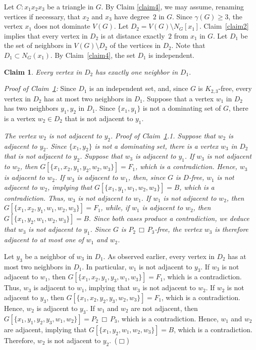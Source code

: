 \documentclass[12pt]{article}
\newtheorem{claim}{Claim}
\newcommand{\smallqed}{{\tiny ($\Box$)}}
\newcommand{\cart}{\, \Box \,}
\newenvironment{unnumbered}[1]{\trivlist \item [\hskip \labelsep {\bf
#1}]\ignorespaces\it}{\endtrivlist}
\begin{document}
\medskip

\noindent Let $C \colon x_1x_2x_3$ be a triangle in $G$. 
By Claim \ref{claim4}, we may assume, renaming vertices if necessary,  that $x_2$ and $x_3$ have degree~$2$ in $G$.
 Since $\gamma(G) \ge 3$, the vertex $x_1$ does not dominate $V(G)$. Let $D_2 = V(G) \setminus N_G[x_1]$. 
 Claim~\ref{claim2} implies that every vertex in $D_2$ is at distance exactly~$2$ from $x_1$ in $G$. 
 Let $D_1$ be the set of neighbors in $V(G) \setminus D_2$ of the vertices in $D_2$. 
 Note that $D_1 \subset N_G(x_1)$. By Claim~\ref{claim4}, the set $D_1$ is independent. 

\begin{claim}\label{claim5}
Every vertex in $D_2$ has exactly one neighbor in $D_1$.
\end{claim}
{\it Proof of Claim~\ref{claim5}:} 
Since $D_1$ is an independent set, and, since $G$ is $K_{2,3}$-free, every vertex in $D_2$ has at most two neighbors in $D_1$. 
Suppose that a vertex $w_1$ in $D_2$ has two neighbors $y_1, y_2$ in $D_1$. 
Since $\{x_1, y_1\}$ is not a dominating set of $G$, there is a vertex $w_2\in D_2$ that is not adjacent to $y_1$.

\begin{unnumbered}{Claim~\ref{claim5}.1}
The vertex $w_2$ is not adjacent to $y_2$.
\end{unnumbered}
{\it Proof of Claim~\ref{claim5}.1.} Suppose that $w_2$ is adjacent to $y_2$.
Since $\{x_1, y_2\}$ is not a dominating set, 
there is a vertex $w_3$ in $D_2$ that is not adjacent to $y_2$. Suppose that $w_3$ is adjacent to $y_1$. If $w_3$ is not adjacent to $w_2$, then $G[\{x_1,x_2,y_1,y_2,w_2,w_3\}]=F_1$, which is a contradiction. Hence, $w_3$ is adjacent to $w_2$. If $w_3$ is adjacent to $w_1$, 
then, since $G$ is $D$-free, $w_1$ is not adjacent to $w_2$, implying that $G[\{x_1,y_1,w_1,w_2,w_3\}]=B$, which is a contradiction. Thus, $w_3$ is not adjacent to $w_1$. If $w_1$ is not adjacent to $w_2$, then  $G[\{x_1,x_2,y_1,w_1,w_2,w_3\}]=F_1$, while, if $w_1$ is adjacent to $w_2$, then  $G[\{x_1,y_2,w_1,w_2,w_3\}]=B$. Since both cases produce a contradiction, we deduce that $w_3$ is not adjacent to $y_1$. Since $G$ is $P_2 \cart P_3$-free, the vertex $w_3$ is therefore adjacent to at most one of $w_1$ and $w_2$.

Let $y_3$ be a neighbor of $w_3$ in $D_1$. As observed earlier, every vertex in $D_2$ has at most two neighbors in $D_1$. In particular, $w_1$ is not adjacent to $y_3$. If $w_3$ is not adjacent to $w_1$, then $G[\{x_1,x_2,y_1,y_3,w_1, w_3\}]=F_1$, which is a contradiction. Thus, $w_3$ is adjacent to $w_1$, implying that $w_3$ is not adjacent to $w_2$. If $w_2$ is not adjacent to $y_3$, then $G[\{x_1,x_2,y_2,y_3,w_2, w_3\}]=F_1$, which is a contradiction. Hence, $w_2$ is adjacent to $y_3$. If $w_1$ and $w_2$ are not adjacent, then $G[\{x_1,y_1,y_2,y_3,w_1, w_2\}]=P_2 \cart P_3$, which is a contradiction. Hence, $w_1$ and $w_2$ are adjacent, implying that $G[\{x_1,y_2,w_1,w_2,w_3\}]=B$, which is a contradiction. Therefore, $w_2$ is not adjacent to $y_2$.~\smallqed
\end{document}
